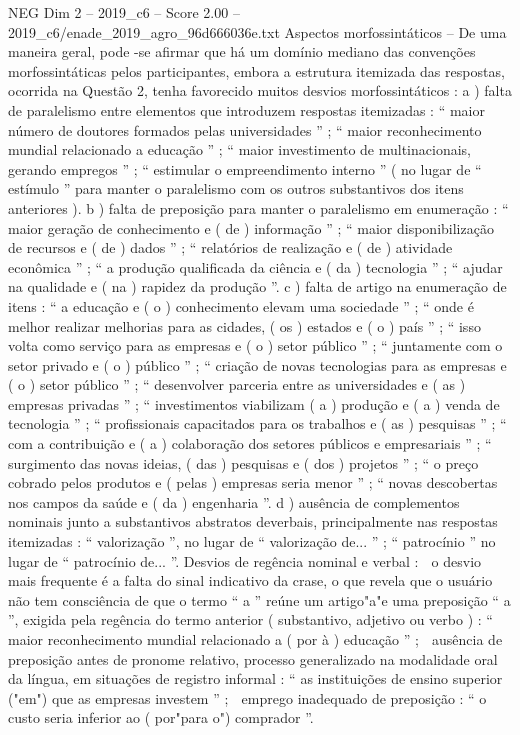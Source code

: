 \begin{textsample}{NEG Dim 2 – 2019\_c6 – Score 2.00 – 2019\_c6/enade\_2019\_agro\_96d666036e.txt}
Aspectos morfossintáticos – De uma maneira geral, pode -se afirmar que há um domínio mediano das convenções morfossintáticas pelos participantes, embora a estrutura itemizada das respostas, ocorrida na Questão 2, tenha favorecido muitos desvios morfossintáticos : a ) falta de paralelismo entre elementos que introduzem respostas itemizadas : “ maior número de doutores formados pelas universidades ” ; “ maior reconhecimento mundial relacionado a educação ” ; “ maior investimento de multinacionais, gerando empregos ” ; “ estimular o empreendimento interno ” ( no lugar de “ estímulo ” para manter o paralelismo com os outros substantivos dos itens anteriores ). b ) falta de preposição para manter o paralelismo em enumeração : “ maior geração de conhecimento e ( de ) informação ” ; “ maior disponibilização de recursos e ( de ) dados ” ; “ relatórios de realização e ( de ) atividade econômica ” ; “ a produção qualificada da ciência e ( da ) tecnologia ” ; “ ajudar na qualidade e ( na ) rapidez da produção ”. c ) falta de artigo na enumeração de itens : “ a educação e ( o ) conhecimento elevam uma sociedade ” ; “ onde é melhor realizar melhorias para as cidades, ( os ) estados e ( o ) país ” ; “ isso volta como serviço para as empresas e ( o ) setor público ” ; “ juntamente com o setor privado e ( o ) público ” ; “ criação de novas tecnologias para as empresas e ( o ) setor público ” ; “ desenvolver parceria entre as universidades e ( as ) empresas privadas ” ; “ investimentos viabilizam ( a ) produção e ( a ) venda de tecnologia ” ; “ profissionais capacitados para os trabalhos e ( as ) pesquisas ” ; “ com a contribuição e ( a ) colaboração dos setores públicos e empresariais ” ; “ surgimento das novas ideias, ( das ) pesquisas e ( dos ) projetos ” ; “ o preço cobrado pelos produtos e ( pelas ) empresas seria menor ” ; “ novas descobertas nos campos da saúde e ( da ) engenharia ”. d ) ausência de complementos nominais junto a substantivos abstratos deverbais, principalmente nas respostas itemizadas : “ valorização ”, no lugar de “ valorização de... ” ; “ patrocínio ” no lugar de “ patrocínio de... ”.
Desvios de regência nominal e verbal :  o desvio mais frequente é a falta do sinal indicativo da crase, o que revela que o usuário não tem consciência de que o termo “ a ” reúne um artigo"a"e uma preposição “ a ”, exigida pela regência do termo anterior ( substantivo, adjetivo ou verbo ) : “ maior reconhecimento mundial relacionado a ( por à ) educação ” ;  ausência de preposição antes de pronome relativo, processo generalizado na modalidade oral da língua, em situações de registro informal : “ as instituições de ensino superior ("em") que as empresas investem ” ;  emprego inadequado de preposição : “ o custo seria inferior ao ( por"para o") comprador ”.

\end{textsample}
